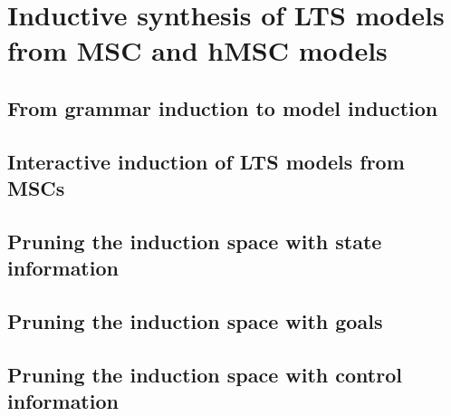 \chapter{Inductive synthesis of LTS models from MSC and hMSC models\label{chapter:inductive-synthesis}}

\section{From grammar induction to model induction}
\section{Interactive induction of LTS models from MSCs}
\section{Pruning the induction space with state information}
\section{Pruning the induction space with goals}
\section{Pruning the induction space with control information}
